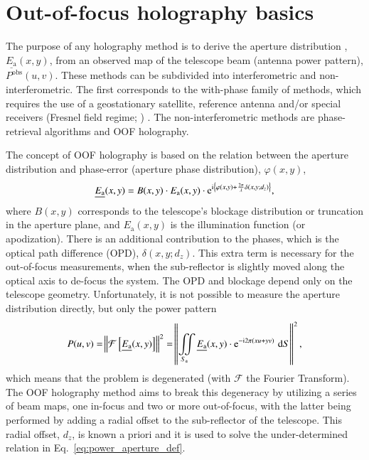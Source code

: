 \documentclass[
    ]
    {aa}
\begin{document}
    \section{Out-of-focus holography basics}
    \label{sec:oofh_basics}

    The purpose of any holography method is to derive the aperture distribution \citep[see][Chapter~5]{2017isra.book.....T}, $\underline{E_\text{a}}(x, y)$, from an observed map of the telescope beam (antenna power pattern), $P^\text{obs}(u, v)$. These methods can be subdivided into interferometric and non-interferometric. The first corresponds to the with-phase family of methods, which requires the use of a geostationary satellite, reference antenna and/or special receivers (Fresnel field regime; \citealt{2007IAPM...49...24B}) . The non-interferometric methods are phase-retrieval algorithms and OOF holography.
    
    The concept of OOF holography is based on the relation between the aperture distribution and phase-error (aperture phase distribution), $\varphi(x, y)$,
    \begin{equation}
        \underline{E_\text{a}}(x, y) = B(x, y)\cdot E_\text{a}(x, y) \cdot \mathrm{e}^{\mathrm i \cbr{\varphi(x, y) + \frac{2\pi}{\lambda}\delta(x,y;d_z)}},
        \label{eq:aperture_distribution}
    \end{equation}
    where $B(x, y)$ corresponds to the telescope's blockage distribution or truncation in the aperture plane, and $E_\text{a}(x, y)$ is the illumination function (or apodization). There is an additional contribution to the phases, which is the optical path difference (OPD), $\delta(x, y;d_z)$. This extra term is necessary for the out-of-focus measurements, when the sub-reflector is slightly moved along the optical axis to de-focus the system. The OPD and blockage depend only on the telescope geometry. Unfortunately, it is not possible to measure the aperture distribution directly, but only the power pattern
    \begin{equation}
        P(u, v) = \enVert{\mathcal{F}\sbr{\underline{E_\text{a}}(x, y)}}^2 = \enVert{\iint\limits_{S_\text{a}} \underline{E_\text{a}}(x,y)\cdot\mathrm{e}^{-\mathrm{i}2\pi (xu+yv)}\, \dif S}^2,
        \label{eq:power_aperture_def}
    \end{equation}
    which means that the problem is degenerated (with $\mathcal{F}$ the Fourier Transform). The OOF holography method aims to break this degeneracy by utilizing a series of beam maps, one in-focus and two or more out-of-focus, with the latter being performed by adding a radial offset to the sub-reflector of the telescope. This radial offset, $d_z$, is known a priori and it is used to solve the under-determined relation in Eq.~\eqref{eq:power_aperture_def}.
\end{document}
